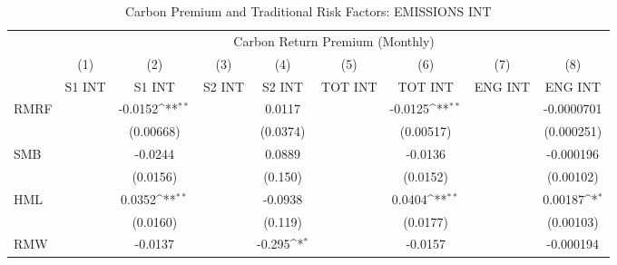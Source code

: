 \begin{table}[htbp]\centering
\def\sym#1{\ifmmode^{#1}\else\(^{#1}\)\fi}
\caption{Carbon Premium and Traditional Risk Factors: EMISSIONS INT}
\begin{tabular}{l*{8}{c}}
\hline\hline
                    &\multicolumn{8}{c}{Carbon Return Premium (Monthly)}                                                                                                                            \\\cmidrule(lr){2-9}
                    &\multicolumn{1}{c}{(1)}&\multicolumn{1}{c}{(2)}&\multicolumn{1}{c}{(3)}&\multicolumn{1}{c}{(4)}&\multicolumn{1}{c}{(5)}&\multicolumn{1}{c}{(6)}&\multicolumn{1}{c}{(7)}&\multicolumn{1}{c}{(8)}\\
                    &\multicolumn{1}{c}{S1 INT}&\multicolumn{1}{c}{S1 INT}&\multicolumn{1}{c}{S2 INT}&\multicolumn{1}{c}{S2 INT}&\multicolumn{1}{c}{TOT INT}&\multicolumn{1}{c}{TOT INT}&\multicolumn{1}{c}{ENG INT}&\multicolumn{1}{c}{ENG INT}\\
\hline
RMRF                &                     &     -0.0152\sym{**} &                     &      0.0117         &                     &     -0.0125\sym{**} &                     &  -0.0000701         \\
                    &                     &   (0.00668)         &                     &    (0.0374)         &                     &   (0.00517)         &                     &  (0.000251)         \\
SMB                 &                     &     -0.0244         &                     &      0.0889         &                     &     -0.0136         &                     &   -0.000196         \\
                    &                     &    (0.0156)         &                     &     (0.150)         &                     &    (0.0152)         &                     &   (0.00102)         \\
HML                 &                     &      0.0352\sym{**} &                     &     -0.0938         &                     &      0.0404\sym{**} &                     &     0.00187\sym{*}  \\
                    &                     &    (0.0160)         &                     &     (0.119)         &                     &    (0.0177)         &                     &   (0.00103)         \\
RMW                 &                     &     -0.0137         &                     &      -0.295\sym{*}  &                     &     -0.0157         &                     &   -0.000194         \\

\end{tabular}
\end{table}
